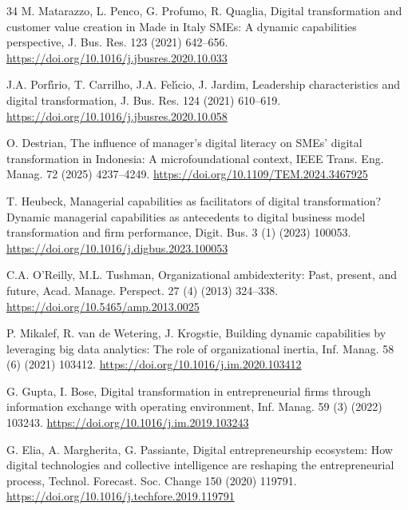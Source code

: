 \documentclass[preprint,12pt]{elsarticle}
\begin{document}
{\begin{thebibliography}{34}
M. Matarazzo, L. Penco, G. Profumo, R. Quaglia, Digital transformation and customer value creation in Made in Italy SMEs: A dynamic capabilities perspective, J. Bus. Res. 123 (2021) 642--656. \newline\url{https://doi.org/10.1016/j.jbusres.2020.10.033}

J.A. Porf\'{\i}rio, T. Carrilho, J.A. Fel\'{\i}cio, J. Jardim, Leadership characteristics and digital transformation, J. Bus. Res. 124 (2021) 610--619. \newline\url{https://doi.org/10.1016/j.jbusres.2020.10.058}

O. Destrian, The influence of manager's digital literacy on SMEs' digital transformation in Indonesia: A microfoundational context, IEEE Trans. Eng. Manag. 72 (2025) 4237--4249. \newline\url{https://doi.org/10.1109/TEM.2024.3467925}

T. Heubeck, Managerial capabilities as facilitators of digital transformation? Dynamic managerial capabilities as antecedents to digital business model transformation and firm performance, Digit. Bus. 3 (1) (2023) 100053. \newline\url{https://doi.org/10.1016/j.digbus.2023.100053}

C.A. O'Reilly, M.L. Tushman, Organizational ambidexterity: Past, present, and future, Acad. Manage. Perspect. 27 (4) (2013) 324--338. \newline\url{https://doi.org/10.5465/amp.2013.0025}

P. Mikalef, R. van de Wetering, J. Krogstie, Building dynamic capabilities by leveraging big data analytics: The role of organizational inertia, Inf. Manag. 58 (6) (2021) 103412. \newline\url{https://doi.org/10.1016/j.im.2020.103412}

G. Gupta, I. Bose, Digital transformation in entrepreneurial firms through information exchange with operating environment, Inf. Manag. 59 (3) (2022) 103243. \newline\url{https://doi.org/10.1016/j.im.2019.103243}

G. Elia, A. Margherita, G. Passiante, Digital entrepreneurship ecosystem: How digital technologies and collective intelligence are reshaping the entrepreneurial process, Technol. Forecast. Soc. Change 150 (2020) 119791. \newline\url{https://doi.org/10.1016/j.techfore.2019.119791}


\end{thebibliography}}
\end{document}
